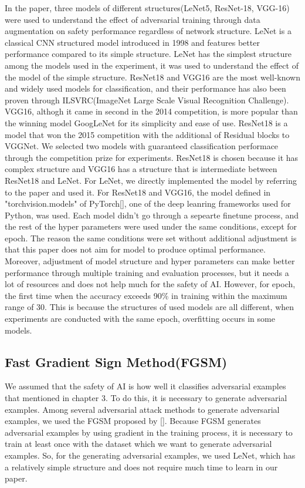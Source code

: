 \documentclass[journal,article,submit,moreauthors,pdftex]{Definitions/mdpi}
\begin{document}
In the paper, three models of different structures(LeNet5, ResNet-18, VGG-16) were used to understand the effect of adversarial training through data augmentation on safety performance regardless of network structure.
LeNet is a classical CNN  structured model introduced in 1998 and features better performance compared to its simple structure.
LeNet has the simplest structure among the models used in the experiment, it was used to understand the effect of the model of the simple structure.
ResNet18 and VGG16 are the most well-known and widely used models for classification, and their performance has also been proven through ILSVRC(ImageNet Large Scale Visual Recognition Challenge).
VGG16, althogh it came in second in the 2014 competition, is more popular than the winning model GoogLeNet for its simplicity and ease of use.
ResNet18 is a model that won the 2015 competition with the additional of Residual blocks to VGGNet.
We selected two models with guaranteed classification performace through the competition prize for experiments.
ResNet18 is chosen because it has complex structure and VGG16 has a structure that is intermediate between ResNet18 and LeNet.
For LeNet, we directly implemented the model by referring to the paper and used it.
For ResNet18 and VGG16, the model defined in "torchvision.models" of PyTorch[], one of the deep leanring frameworks used for Python, was used.
Each model didn't go through a sepearte finetune process, and the rest of the hyper parameters were used under the same conditions, except for epoch.
The reason the same conditions were set without additional adjustment is that this paper does not aim for model to produce optimal performance.
Moreover, adjustment of model structure and hyper parameters can make better performance through multiple training and evaluation processes, but it needs a lot of resources and does not help much for the safety of AI.
However, for epoch, the first time when the accuracy exceeds 90\% in training within the maximum range of 30. This is because the structures of used models are all different, when experiments are conducted with the same epoch, overfitting occurs in some models.

\subsection{Fast Gradient Sign Method(FGSM)}

We assumed that the safety of AI is how well it classifies adversarial examples that mentioned in chapter 3.
To do this, it is necessary to generate adversarial examples. Among several adversarial attack methods to generate adversarial examples, we used the FGSM proposed by [].
Because FGSM generates adversarial examples by using gradient in the training process, it is necessary to train at least once with the dataset which we want to generate adversarial examples.
So, for the generating adversarial examples, we used LeNet, which has a relatively simple structure and does not require much time to learn in our paper.
\end{document}
